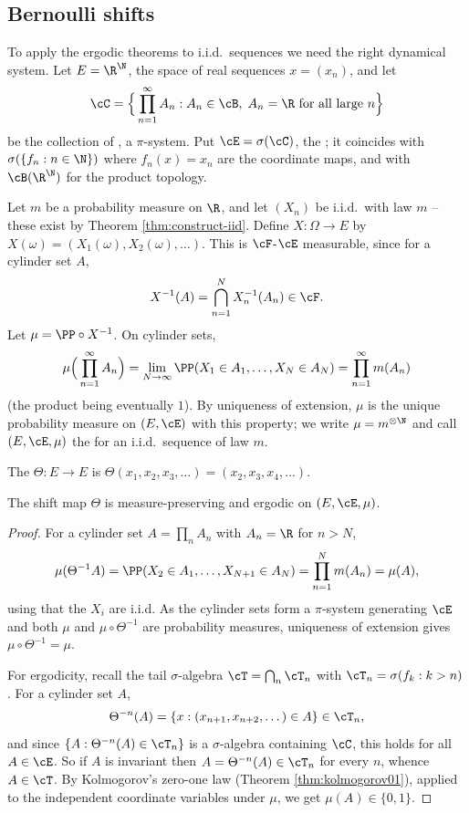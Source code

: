 \subsection{Bernoulli shifts}

To apply the ergodic theorems to i.i.d.\ sequences we need the right dynamical system. Let $E = \R^\N$, the space of real sequences $x = (x_n)$, and let
$$
\cC = \Big\{ \prod_{n=1}^\infty A_n : A_n \in \cB, \; A_n = \R \text{ for all large } n \Big\}
$$
be the collection of , a $\pi$-system. Put $\cE = \sigma(\cC)$, the ; it coincides with $\sigma(\{f_n : n \in \N\})$ where $f_n(x)=x_n$ are the coordinate maps, and with $\cB(\R^\N)$ for the product topology.

Let $m$ be a probability measure on $\R$, and let $(X_n)$ be i.i.d.\ with law $m$ -- these exist by Theorem \ref{thm:construct-iid}. Define $X : \Omega \to E$ by $X(\omega)=(X_1(\omega),X_2(\omega),\dots)$. This is $\cF$-$\cE$ measurable, since for a cylinder set $A$,
$$
X^{-1}(A) = \bigcap_{n=1}^N X_n^{-1}(A_n) \in \cF.
$$
Let $\mu = \PP\circ X^{-1}$. On cylinder sets,
$$
\mu\Big(\prod_{n=1}^\infty A_n\Big) = \lim_{N\to\infty}\PP(X_1 \in A_1,\dots,X_N \in A_N) = \prod_{n=1}^\infty m(A_n)
$$
(the product being eventually $1$). By uniqueness of extension, $\mu$ is the unique probability measure on $(E,\cE)$ with this property; we write $\mu = m^{\otimes\N}$ and call $(E,\cE,\mu)$ the  for an i.i.d.\ sequence of law $m$.

\begin{definition}
	The  $\Theta : E \to E$ is $\Theta(x_1,x_2,x_3,\dots)=(x_2,x_3,x_4,\dots)$.
\end{definition}

\begin{theorem}\label{thm:shift-ergodic}
	The shift map $\Theta$ is measure-preserving and ergodic on $(E,\cE,\mu)$.
\end{theorem}
\begin{proof}
	For a cylinder set $A = \prod_n A_n$ with $A_n = \R$ for $n>N$,
	$$
	\mu(\Theta^{-1}A)=\PP(X_2\in A_1,\dots,X_{N+1}\in A_N)=\prod_{n=1}^N m(A_n)=\mu(A),
	$$
	using that the $X_i$ are i.i.d. As the cylinder sets form a $\pi$-system generating $\cE$ and both $\mu$ and $\mu\circ\Theta^{-1}$ are probability measures, uniqueness of extension gives $\mu\circ\Theta^{-1}=\mu$.

	For ergodicity, recall the tail $\sigma$-algebra $\cT = \bigcap_n \cT_n$ with $\cT_n = \sigma(f_k : k>n)$. For a cylinder set $A$,
	$$
	\Theta^{-n}(A) = \{x : (x_{n+1},x_{n+2},\dots)\in A\} \in \cT_n,
	$$
	and since $\{A : \Theta^{-n}(A)\in\cT_n\}$ is a $\sigma$-algebra containing $\cC$, this holds for all $A \in \cE$. So if $A$ is invariant then $A = \Theta^{-n}(A)\in\cT_n$ for every $n$, whence $A \in \cT$. By Kolmogorov's zero-one law (Theorem \ref{thm:kolmogorov01}), applied to the independent coordinate variables under $\mu$, we get $\mu(A)\in\{0,1\}$.
\end{proof}

